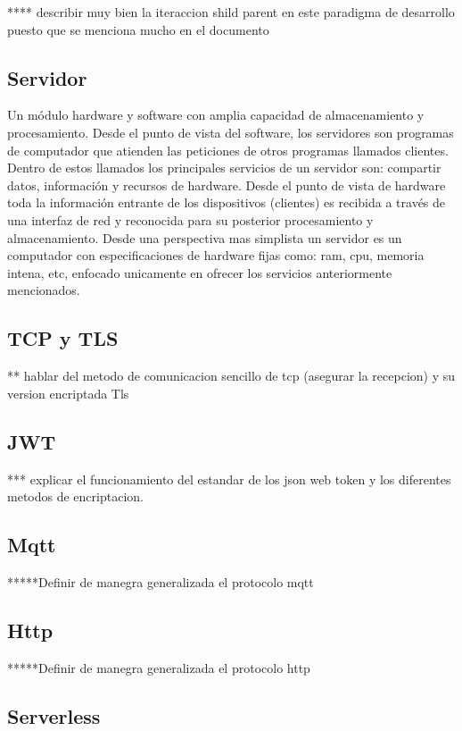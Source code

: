 **** describir muy bien la iteraccion shild parent en este paradigma de desarrollo puesto que se menciona mucho en el documento

\subsection{Servidor}

Un módulo hardware y software con amplia capacidad de almacenamiento y procesamiento. Desde el punto de vista del software, los servidores son programas de computador que atienden las peticiones de otros programas llamados clientes. Dentro de estos llamados los principales servicios de un servidor son: compartir datos, información y recursos de hardware. Desde el punto de vista de hardware toda la información entrante de los dispositivos (clientes) es recibida a través de una interfaz de red y reconocida para su posterior procesamiento y almacenamiento.
Desde una perspectiva mas simplista un servidor es un computador con especificaciones de hardware fijas como: ram, cpu, memoria intena, etc, enfocado unicamente en ofrecer los servicios anteriormente mencionados.


\subsection{TCP y TLS}

** hablar del metodo de comunicacion sencillo de tcp (asegurar la recepcion) y su version encriptada Tls

\subsection{JWT}

*** explicar el funcionamiento del estandar de los json web token y los diferentes metodos de encriptacion.

\subsection{Mqtt}

*****Definir de manegra generalizada el protocolo mqtt

\subsection{Http}

*****Definir de manegra generalizada el protocolo http


\subsection{Serverless}

